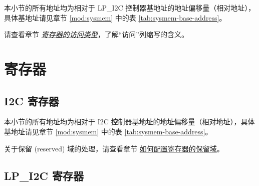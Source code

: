 \documentclass[main\_\_CN.tex]{subfiles}
\begin{document}
本小节的所有地址均为相对于 LP\_I2C 控制器基地址的地址偏移量（相对地址），具体基地址请见章节 \ref{mod:sysmem} \textit{} 中的表 \ref{tab:sysmem-base-address}。

请查看章节 \hyperref[glossary-access-types]{\textit{寄存器的访问类型}}，了解“访问”列缩写的含义。





\newpage
\section{寄存器}

\subsection{I2C 寄存器}

本小节的所有地址均为相对于 I2C 控制器基地址的地址偏移量（相对地址），具体基地址请见章节 \ref{mod:sysmem} \textit{} 中的表 \ref{tab:sysmem-base-address}。

关于保留 (reserved) 域的处理，请查看章节 \hyperref[programming-reserved-field]{如何配置寄存器的保留域}。



\subsection{LP\_I2C 寄存器}


\end{document}
